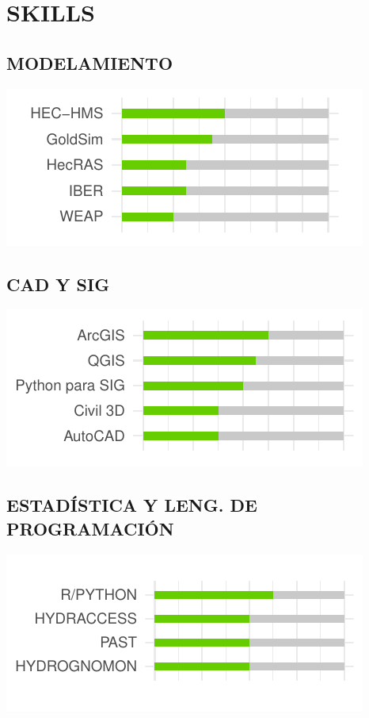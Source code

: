\documentclass[
  10,
]{article}
\begin{document}
\hypertarget{skills}{%
\section{SKILLS}\label{skills}}

\hypertarget{modelamiento}{%
\subsection{MODELAMIENTO}\label{modelamiento}}

\includegraphics{resume_v01a_files/figure-latex/unnamed-chunk-1-1.pdf}

\hypertarget{cad-y-sig}{%
\subsection{CAD Y SIG}\label{cad-y-sig}}

\includegraphics{resume_v01a_files/figure-latex/unnamed-chunk-2-1.pdf}

\hypertarget{estaduxedstica-y-leng.-de-programaciuxf3n}{%
\subsection{ESTADÍSTICA Y LENG. DE
PROGRAMACIÓN}\label{estaduxedstica-y-leng.-de-programaciuxf3n}}

\includegraphics{resume_v01a_files/figure-latex/unnamed-chunk-3-1.pdf}
\end{document}

